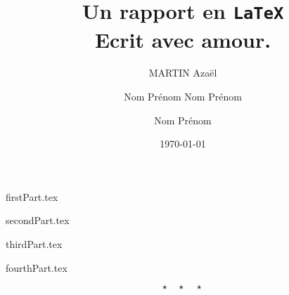 \documentclass{rUTT}
\title{
    Un rapport en \texttt{LaTeX} \\
    Ecrit avec amour.
    }
\date{\today}
\author{
    {\sc MARTIN} Azaël
    \and
    {\sc Nom} Prénom
    \break
    {\sc Nom} Prénom
    \and
    {\sc Nom} Prénom
    \break
    }
\begin{document}
    \frontpage
    \tableofcontents %

    \clearpage

    \justifying

    {firstPart.tex}

    \clearpage

    {secondPart.tex}

    \clearpage

    {thirdPart.tex}

    \clearpage

    {fourthPart.tex}

    \medskip %

    \[ \star \quad \star \quad \star \]

    \nocite{*} %

    {
    \RaggedRight %
    \sloppy
    \printbibliography[title={Bibliographie}]
    }
\end{document}
